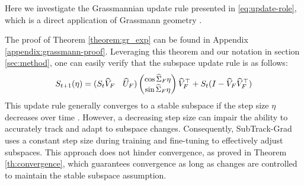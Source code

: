 Here we investigate the Grassmannian update rule presented in \eqref{eq:update-role}, which is
a direct application of Grassmann geometry \citep{edelman1998geometryalgorithmsorthogonalityconstraints, Bendokat_2024}.



The proof of Theorem \ref{theorem:gr_exp} can be found in Appendix \ref{appendix:grassmann-proof}. Leveraging this theorem and our notation in section \ref{sec:method}, one can easily verify that the subspace update rule is as follows:
\begin{equation*}
\small
    S_{t+1}(\eta) = (S_t\widehat{V}_F \quad \widehat{U}_F) \begin{pmatrix} \cos{\widehat{\Sigma}_F \eta} \\ \sin{\widehat{\Sigma}_F \eta} \end{pmatrix} \widehat{V}^\top_F + S_t(I - \widehat{V}_F\widehat{V}^\top_F)
\end{equation*}
This update rule generally converges to a stable subspace if the step size \(\eta\) decreases over time \citep{balzano2011onlineidentificationtrackingsubspaces}. However, a decreasing step size can impair the ability to accurately track and adapt to subspace changes. Consequently, SubTrack-Grad uses a constant step size during training and fine-tuning to effectively adjust subspaces. This approach does not hinder convergence, as proved in Theorem \ref{th:convergence}, which guarantees convergence as long as changes are controlled to maintain the stable subspace assumption. 
